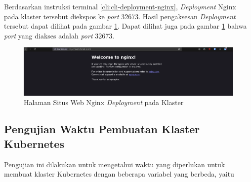 Berdasarkan instruksi terminal \ref{cli:cli-deployment-nginx}, \emph{Deployment}
Nginx pada klaster tersebut diekspos ke \emph{port} 32673. Hasil pengaksesan
\emph{Deployment} tersebut dapat dilihat pada gambar \ref{fig:nginx-deployment}.
Dapat dilihat juga pada gambar \ref{fig:nginx-deployment} bahwa \emph{port} yang diakses adalah
\emph{port} 32673.

\begin{figure}[H]
  \centering
  \includegraphics[scale=0.3]{gambar/nginx-deployment.png}
  \caption{Halaman Situs Web Nginx \emph{Deployment} pada Klaster}
  \label{fig:nginx-deployment}
\end{figure}

\subsection{Pengujian Waktu Pembuatan Klaster Kubernetes}
\label{subsec:pengujian-deployment}

Pengujian ini dilakukan untuk mengetahui waktu yang diperlukan untuk membuat
klaster Kubernetes dengan beberapa variabel yang berbeda, yaitu 


